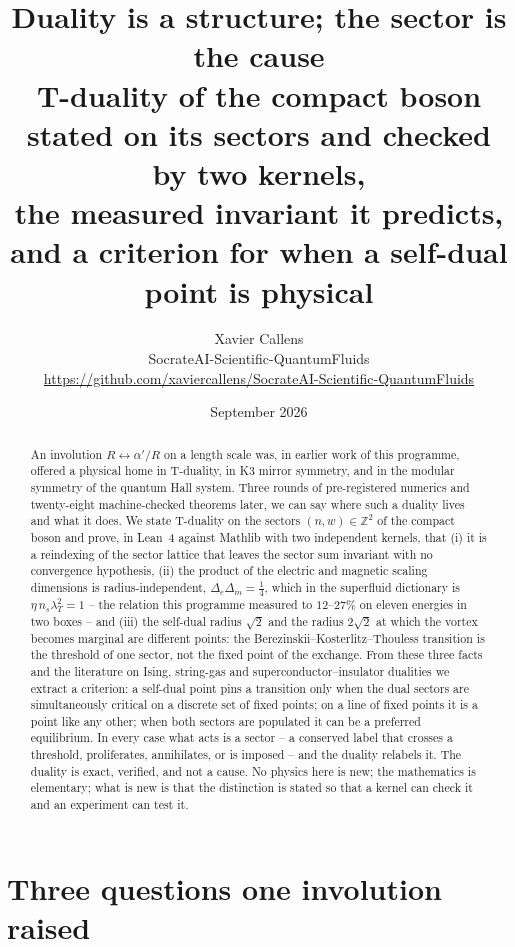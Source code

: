 \documentclass[11pt,a4paper]{article}
\title{\textbf{Duality is a structure; the sector is the cause}\\
\large T-duality of the compact boson stated on its sectors and checked by two kernels,\\
the measured invariant it predicts, and a criterion for when a self-dual point is physical}
\author{Xavier Callens\\
\small SocrateAI-Scientific-QuantumFluids\\
\small \url{https://github.com/xaviercallens/SocrateAI-Scientific-QuantumFluids}}
\date{September 2026}
\begin{document}
\maketitle

\begin{abstract}
\noindent
An involution $R\leftrightarrow\alpha'/R$ on a length scale was, in earlier work of this programme, offered a
physical home in T-duality, in K3 mirror symmetry, and in the modular symmetry of the quantum Hall system. Three
rounds of pre-registered numerics and twenty-eight machine-checked theorems later, we can say where such a
duality lives and what it does. We state T-duality on the sectors $(n,w)\in\mathbb Z^2$ of the compact boson and
prove, in Lean~4 against Mathlib with two independent kernels, that (i) it is a reindexing of the sector lattice
that leaves the sector sum invariant with no convergence hypothesis, (ii) the product of the electric and magnetic
scaling dimensions is radius-independent, $\Delta_e\Delta_m=\tfrac14$, which in the superfluid dictionary is
$\eta\,n_s\lambda_T^2=1$ -- the relation this programme measured to $12$--$27\%$ on eleven energies in two boxes --
and (iii) the self-dual radius $\sqrt2$ and the radius $2\sqrt2$ at which the vortex becomes marginal are
different points: the Berezinskii--Kosterlitz--Thouless transition is the threshold of one sector, not the fixed
point of the exchange. From these three facts and the literature on Ising, string-gas and superconductor--insulator
dualities we extract a criterion: a self-dual point pins a transition only when the dual sectors are simultaneously
critical on a discrete set of fixed points; on a line of fixed points it is a point like any other; when both
sectors are populated it can be a preferred equilibrium. In every case what acts is a sector -- a conserved label
that crosses a threshold, proliferates, annihilates, or is imposed -- and the duality relabels it. The duality is
exact, verified, and not a cause. No physics here is new; the mathematics is elementary; what is new is that the
distinction is stated so that a kernel can check it and an experiment can test it.
\end{abstract}

\section{Three questions one involution raised}
\end{document}
